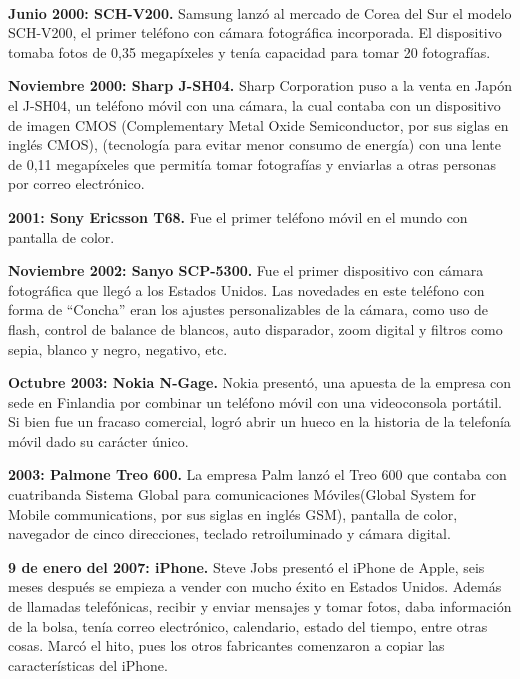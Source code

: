 \\ \par
\textbf{Junio 2000: SCH-V200.}
Samsung lanzó al mercado de Corea del Sur el modelo SCH-V200, el primer teléfono con cámara fotográfica incorporada. El dispositivo tomaba fotos de 0,35 megapíxeles y tenía capacidad para tomar 20 fotografías.
\\ \par
\textbf{Noviembre 2000: Sharp J-SH04.}
Sharp Corporation puso a la venta en Japón el J-SH04, un teléfono móvil con una cámara, la cual contaba con un dispositivo de imagen CMOS (Complementary Metal Oxide Semiconductor, por sus siglas en inglés CMOS), (tecnología para evitar menor consumo de energía) con una lente de 0,11 megapíxeles que permitía tomar fotografías y enviarlas a otras personas por correo electrónico.
\\ \par
\textbf{2001: Sony Ericsson T68.}
Fue el primer teléfono móvil en el mundo con pantalla de color.
\\ \par
\textbf{Noviembre 2002: Sanyo SCP-5300.}
Fue el primer dispositivo con cámara fotográfica que llegó a los Estados Unidos. Las novedades en este teléfono con forma de “Concha” eran los ajustes personalizables de la cámara, como uso de flash, control de balance de blancos, auto disparador, zoom digital y filtros como sepia, blanco y negro, negativo, etc.
\\ \par
\textbf{Octubre 2003: Nokia N-Gage.}
Nokia presentó, una apuesta de la empresa con sede en Finlandia por combinar un teléfono móvil con una videoconsola portátil. Si bien fue un fracaso comercial, logró abrir un hueco en la historia de la telefonía móvil dado su carácter único.
\\ \par
\textbf{2003: Palmone Treo 600.}
La empresa Palm lanzó el Treo 600 que contaba con cuatribanda Sistema Global para comunicaciones Móviles(Global System for Mobile communications, por sus siglas en inglés GSM), pantalla de color, navegador de cinco direcciones, teclado retroiluminado y cámara digital.
\\ \par
\textbf{9 de enero del 2007: iPhone.}
Steve Jobs presentó el iPhone de Apple, seis meses después se empieza a vender con mucho éxito en Estados Unidos. Además de llamadas telefónicas, recibir y enviar mensajes y tomar fotos, daba información de la bolsa, tenía correo electrónico, calendario, estado del tiempo, entre otras cosas. Marcó el hito, pues los otros fabricantes comenzaron a copiar las características del iPhone.
